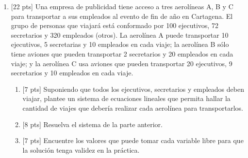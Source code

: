 \documentclass[11pt]{article}
\begin{document}
\begin{enumerate}
\item{}[22 pts] Una empresa de publicidad tiene acceso a tres aerolíneas A, B y C para transportar a sus empleados al evento de fin de año en Cartagena. El grupo de personas que viajará está conformado por 100 ejecutivos, 72 secretarios y 320 empleados (otros). La aerolínea A puede transportar 10 ejecutivos, 5 secretarias y 10 empleados en cada viaje; la aerolínea B sólo tiene aviones que pueden transportar 2 secretarios y 20 empleados en cada viaje; y la aerolínea C usa aviones que pueden transportar 20 ejecutivos, 9 secretarios y 10 empleados en cada viaje.
\begin{enumerate}
\item{}[7 pts] Suponiendo que todos los ejecutivos, secretarios y empleados deben viajar, plantee un sistema de ecuaciones lineales que permita hallar la cantidad de viajes que debería realizar cada aerolínea para transportarlos.

\vspace{4cm}

\item{}[8 pts] Resuelva el sistema de la parte anterior.

\vspace{5cm}

\item{}[7 pts] Encuentre los valores que puede tomar cada variable libre para que la solución tenga validez en la práctica.

\vspace{3cm}
\end{enumerate}
\end{enumerate}

\examfooter
\end{document}

